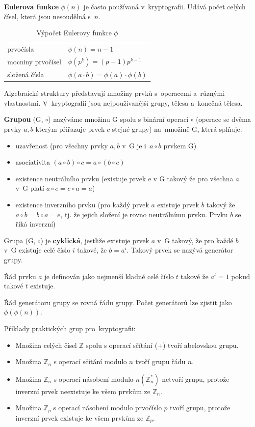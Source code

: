 \textbf{Eulerova funkce} $\phi(n)$ je často používaná v~kryptografii. Udává počet celých čísel, která jsou nesoudělná s~$n$.

\begin{table}[ht]
    \centering
    \caption{Výpočet Eulerovy funkce $\phi$}
    \begin{tabular}{l|l}
        prvočísla & $\phi(n) = n-1$ \\
        mocniny prvočísel & $\phi(p^k) = (p-1) p^{k-1}$ \\
        složená čísla & $\phi(a \cdot b) = \phi(a) \cdot \phi(b)$ \\
    \end{tabular}
\end{table}

Algebraické struktury představují množiny prvků s~operacemi a~různými vlastnostmi. V~kryptografii jsou nejpoužívanější grupy, tělesa a~konečná tělesa.

\textbf{Grupou} (G, $\circ$) nazýváme množinu G spolu s binární operací $\circ$ (operace se dvěma prvky $a, b$ kterým přiřazuje prvek $c$ stejné grupy) na~množině G, která splňuje:

\begin{itemize}[noitemsep]
    \item uzavřenost (pro všechny prvky $a, b$ v~G je i~$a \circ b$ prvkem G)
    \item asociativita $(a \circ b) \circ c = a \circ (b \circ c)$
    \item existence neutrálního prvku (existuje prvek e v G takový že pro všechna $a$ v~G platí $a \circ e = e \circ a = a$)
    \item existence inverzního prvku (pro každý prvek $a$ existuje prvek $b$ takový že $a \circ b = b \circ a = e$, tj. že jejich složení je rovno neutrálnímu prvku. Prvku $b$ se říká inverzní)
\end{itemize}

Grupa (G, $\circ$) je \textbf{cyklická}, jestliže existuje prvek $a$ v~G takový, že pro každé $b$ v~G existuje celé číslo $i$ takové, že $b = a^i$. Takový prvek se nazývá generátor grupy. 

Řád prvku $a$ je definován jako nejmenší kladné celé číslo $t$ takové že $a^t = 1$ pokud takové $t$ existuje. 

Řád generátoru grupy se rovná řádu grupy. Počet generátorů lze zjistit jako $\phi(\phi(n))$.

Příklady praktických grup pro~kryptografii:
\begin{itemize}[noitemsep]
    \item Množina celých čísel $\mathbb{Z}$ spolu s operací sčítání (+) tvoří abelovskou grupu.
    \item Množina $\mathbb{Z}_n$ s operací sčítání modulo $n$ tvoří grupu řádu $n$.
    \item Množina $\mathbb{Z}_n$ s operací násobení modulo $n (\mathbb{Z}_n^*)$ netvoří grupu, protože inverzní prvek neexistuje ke všem prvkům ze $\mathbb{Z}_n$.
    \item Množina $\mathbb{Z}_p$ s operací násobení modulo prvočíslo $p$ tvoří grupu, protože inverzní prvek existuje ke všem prvkům ze $\mathbb{Z}_p$. 
\end{itemize}

